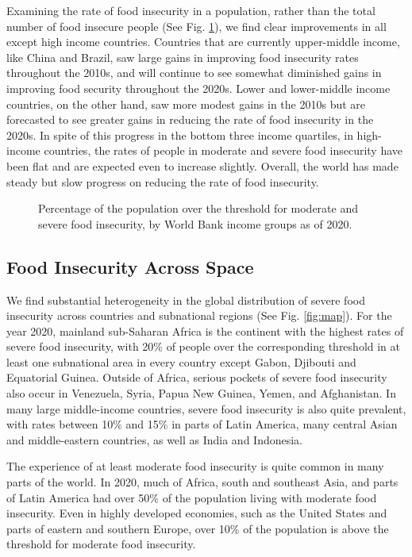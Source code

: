 \documentclass[titlepage]{article}
\begin{document}
Examining the rate of food insecurity in a population, rather than the total number of food insecure people (See Fig. \ref{fig:rates}), we find clear improvements in all except high income countries.  Countries that are currently upper-middle income, like China and Brazil, saw large gains in improving food insecurity rates throughout the 2010s, and will continue to see somewhat diminished gains in improving food security throughout the 2020s.  Lower and lower-middle income countries, on the other hand, saw more modest gains in the 2010s but are forecasted to see greater gains in reducing the rate of food insecurity in the 2020s.  In spite of this progress in the bottom three income quartiles, in high-income countries, the rates of people in moderate and severe food insecurity have been flat and are expected even to increase slightly.  Overall, the world has made steady but slow progress on reducing the rate of food insecurity.

\begin{figure}[H]
  \centering
  \caption{Percentage of the population over the threshold for moderate and severe food insecurity, by World Bank income groups as of 2020.}
  \label{fig:rates}
\end{figure}


\subsection{Food Insecurity Across Space}
We find substantial heterogeneity in the global distribution of severe food insecurity across countries and subnational regions (See Fig. \ref{fig:map}).  For the year 2020, mainland sub-Saharan Africa is the continent with the highest rates of severe food insecurity, with 20\% of people over the corresponding threshold in at least one subnational area in every country except Gabon, Djibouti and Equatorial Guinea.  Outside of Africa, serious pockets of severe food insecurity also occur in Venezuela, Syria, Papua New Guinea, Yemen, and Afghanistan.  In many large middle-income countries, severe food insecurity is also quite prevalent, with rates between 10\% and 15\% in parts of Latin America, many central Asian and middle-eastern countries, as well as India and Indonesia.  

The experience of at least moderate food insecurity is quite common in many parts of the world.  In 2020, much of Africa, south and southeast Asia, and parts of Latin America had over 50\% of the population living with moderate food insecurity.  Even in highly developed economies, such as the United States and parts of eastern and southern Europe, over 10\% of the population is above the threshold for moderate food insecurity.
\end{document}
